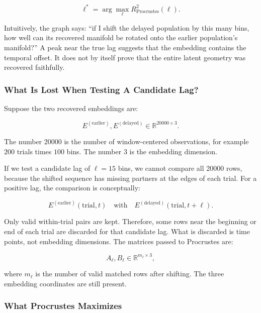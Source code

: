 \documentclass[11pt]{article}
\begin{document}
\begin{equation}
\ell^\ast =
\arg\max_\ell
R^2_{\text{Procrustes}}(\ell).
\end{equation}

Intuitively, the graph says: ``if I shift the delayed population by this many
bins, how well can its recovered manifold be rotated onto the earlier
population's manifold?'' A peak near the true lag suggests that the embedding
contains the temporal offset. It does not by itself prove that the entire
latent geometry was recovered faithfully.

\subsubsection{What Is Lost When Testing A Candidate Lag?}

Suppose the two recovered embeddings are:

\begin{equation}
E^{(\text{earlier})},
E^{(\text{delayed})}
\in
\mathbb{R}^{20000 \times 3}.
\end{equation}

The number 20000 is the number of window-centered observations, for example
$200$ trials times $100$ bins. The number 3 is the embedding dimension.

If we test a candidate lag of $\ell=15$ bins, we cannot compare all 20000 rows,
because the shifted sequence has missing partners at the edges of each trial.
For a positive lag, the comparison is conceptually:

\begin{equation}
E^{(\text{earlier})}(\text{trial},t)
\quad \text{with} \quad
E^{(\text{delayed})}(\text{trial},t+\ell).
\end{equation}

Only valid within-trial pairs are kept. Therefore, some rows near the beginning
or end of each trial are discarded for that candidate lag. What is discarded is
time points, not embedding dimensions. The matrices passed to Procrustes are:

\begin{equation}
A_\ell, B_\ell \in \mathbb{R}^{m_\ell \times 3},
\end{equation}

where $m_\ell$ is the number of valid matched rows after shifting. The three
embedding coordinates are still present.

\subsubsection{What Procrustes Maximizes}
\end{document}
